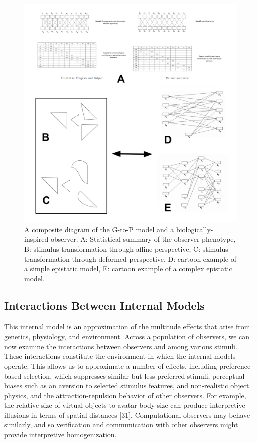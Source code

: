\documentclass{article}
\begin{document}
\begin{figure}[!htb]
  \centering
  \includegraphics{graphical-abstract.png}
  \caption{A composite diagram of the G-to-P model and a biologically-inspired observer. A: Statistical summary of the observer phenotype, B: stimulus transformation through affine perspective, C: stimulus transformation through deformed perspective, D: cartoon example of a simple epistatic model, E: cartoon example of a complex epistatic model.}
\end{figure}

\subsection{Interactions Between Internal Models}
This internal model is an approximation of the multitude effects that arise from genetics, physiology, and environment. Across a population of observers, we can now examine the interactions between observers and among various stimuli. These interactions constitute the environment in which the internal models operate. This allows us to approximate a number of effects, including preference-based selection, which suppresses similar but less-preferred stimuli, perceptual biases such as an aversion to selected stimulus features, and non-realistic object physics, and the attraction-repulsion behavior of other observers. For example, the relative size of virtual objects to avatar body size can produce interpretive illusions in terms of spatial distances [31]. Computational observers may behave similarly, and so verification and communication with other observers might provide interpretive homogenization.
\end{document}
